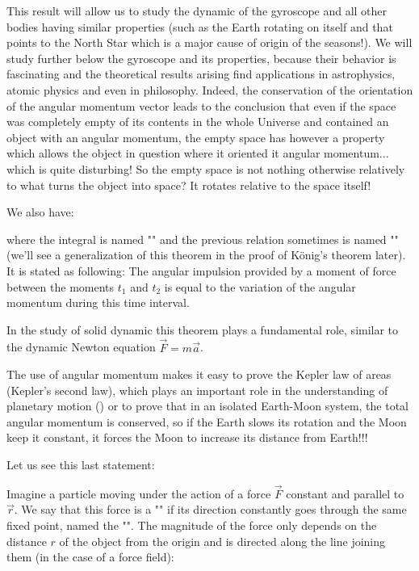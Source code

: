 	This result will allow us to study the dynamic of the gyroscope and all other bodies having similar properties (such as the Earth rotating on itself and that points to the North Star which is a major cause of origin of the seasons!). We will study further below the gyroscope and its properties, because their behavior is fascinating and the theoretical results arising find applications in astrophysics, atomic physics and even in philosophy. Indeed, the conservation of the orientation of the angular momentum vector leads to the conclusion that even if the space was completely empty of its contents in the whole Universe and contained an object with an angular momentum, the empty space has however a property which allows the object in question where it oriented it angular momentum... which is quite disturbing! So the empty space is not nothing otherwise relatively to what turns the object into space? It rotates relative to the space itself!
	
	We also have:
	
	where the integral is named "" and the previous relation sometimes is named "" (we'll see a generalization of this theorem in the proof of König's theorem later). It is stated as following: The angular impulsion provided by a moment of force between the moments $t_1$ and $t_2$ is equal to the variation of the angular momentum during this time interval.
	
	In the study of solid dynamic this theorem plays a fundamental role, similar to the dynamic Newton equation $\vec{F}=m\vec{a}$.
	
	The use of angular momentum makes it easy to prove the Kepler law of areas (Kepler's second law), which plays an important role in the understanding of planetary motion () or to prove that in an isolated Earth-Moon system, the total angular momentum is conserved, so if the Earth slows its rotation and the Moon keep it constant, it forces the Moon to increase its distance from Earth!!!
	
	Let us see this last statement:
	
	Imagine a particle moving under the action of a force $\vec{F}$ constant and parallel to $\vec{r}$. We say that this force is a "" if its direction constantly goes through the same fixed point, named the "". The magnitude of the force  only depends on the distance $r$ of the object from the origin and is directed along the line joining them (in the case of a force field):
	
